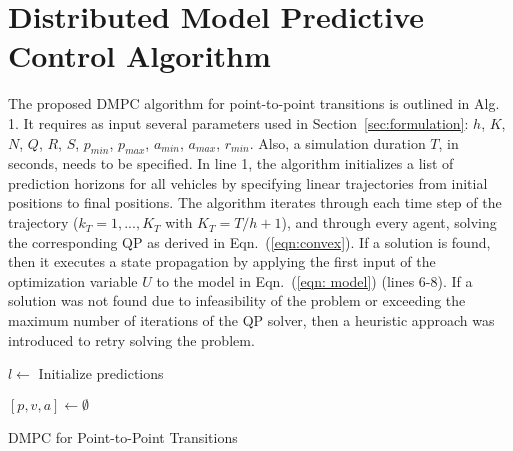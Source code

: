 \section{Distributed Model Predictive Control Algorithm}
\label{sec:problemStatement}
The proposed DMPC algorithm for point-to-point transitions is outlined in Alg. 1. It requires as input several parameters used in Section~\ref{sec:formulation}: $h$, $K$, $N$, $Q$, $R$, $S$, $p_{min}$, $p_{max}$, $a_{min}$, $a_{max}$, $r_{min}$. Also, a simulation duration $T$, in seconds, needs to be specified. In line 1, the algorithm initializes a list of prediction horizons for all vehicles by specifying linear trajectories from initial positions to final positions. The algorithm iterates through each time step of the trajectory ($k_T = {1,...,K_T}$ with $K_T = T/h + 1$), and through every agent, solving the corresponding QP as derived in Eqn.~(\ref{eqn:convex}). If a solution is found, then it executes a state propagation by applying the first input of the optimization variable $U$ to the model in  Eqn.~(\ref{eqn: model}) (lines 6-8). If a solution was not found due to infeasibility of the problem or exceeding the maximum number of iterations of the QP solver, then a heuristic approach was introduced to retry solving the problem.

\begin{algorithm}
	
	$l \leftarrow$ Initialize predictions
	
{$[p,v,a] \leftarrow \emptyset$ 
}
\KwRet {$[p,v,a]$}
\caption{DMPC for Point-to-Point Transitions}
\end{algorithm}

